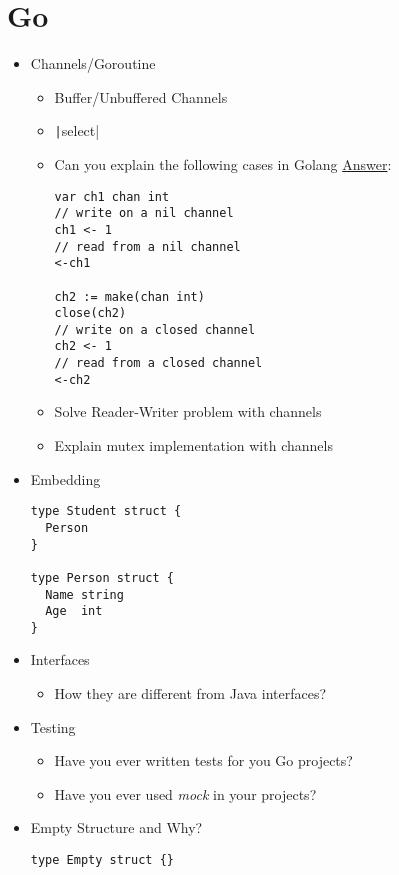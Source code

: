 \documentclass[]{book}
\begin{document}
\section{Go}

\begin{itemize}
  \item Channels/Goroutine
    \begin{itemize}
      \item Buffer/Unbuffered Channels
      \item \texttt|select|
      \item Can you explain the following cases in Golang \href{https://stackoverflow.com/questions/39015602/how-does-a-non-initialized-channel-behave)}{Answer}:
        \begin{verbatim}
var ch1 chan int
// write on a nil channel
ch1 <- 1
// read from a nil channel
<-ch1

ch2 := make(chan int)
close(ch2)
// write on a closed channel
ch2 <- 1
// read from a closed channel
<-ch2
        \end{verbatim}
      \item Solve Reader-Writer problem with channels
      \item Explain mutex implementation with channels
    \end{itemize}

  \item Embedding
    \begin{verbatim}
type Student struct {
  Person
}

type Person struct {
  Name string
  Age  int
}
    \end{verbatim}

  \item Interfaces
    \begin{itemize}
      \item How they are different from Java interfaces?
    \end{itemize}

  \item Testing
    \begin{itemize}
      \item Have you ever written tests for you Go projects?
      \item Have you ever used \textit{mock} in your projects?
    \end{itemize}

  \item Empty Structure and Why?
    \begin{verbatim}
type Empty struct {}
    \end{verbatim}


\end{itemize}
\end{document}
